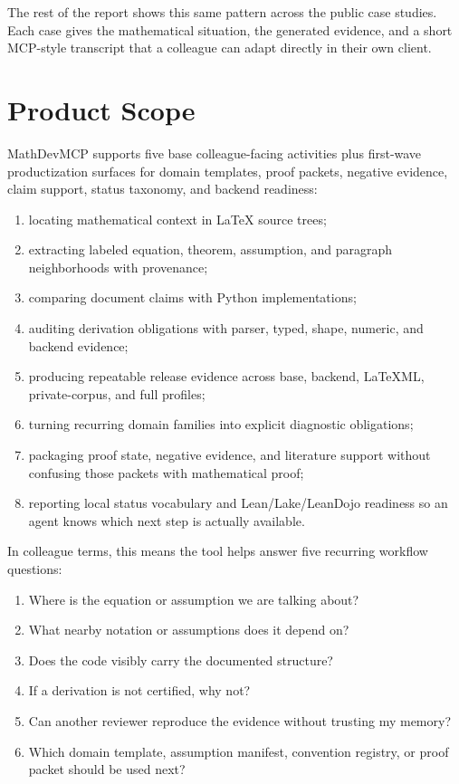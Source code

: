 \documentclass[12pt,a4paper,openany]{book}
\begin{document}
The rest of the report shows this same pattern across the public case studies.
Each case gives the mathematical situation, the generated evidence, and a short
MCP-style transcript that a colleague can adapt directly in their own client.

\chapter{Product Scope}

MathDevMCP supports five base colleague-facing activities plus first-wave
productization surfaces for domain templates, proof packets, negative evidence,
claim support, status taxonomy, and backend readiness:

\begin{enumerate}[label=\arabic*.]
  \item locating mathematical context in LaTeX source trees;
  \item extracting labeled equation, theorem, assumption, and paragraph
        neighborhoods with provenance;
  \item comparing document claims with Python implementations;
  \item auditing derivation obligations with parser, typed, shape, numeric, and
        backend evidence;
  \item producing repeatable release evidence across base, backend, LaTeXML,
        private-corpus, and full profiles;
  \item turning recurring domain families into explicit diagnostic obligations;
  \item packaging proof state, negative evidence, and literature support without
        confusing those packets with mathematical proof;
  \item reporting local status vocabulary and Lean/Lake/LeanDojo readiness so an
        agent knows which next step is actually available.
\end{enumerate}

In colleague terms, this means the tool helps answer five recurring workflow
questions:

\begin{enumerate}[label=\alph*.]
  \item Where is the equation or assumption we are talking about?
  \item What nearby notation or assumptions does it depend on?
  \item Does the code visibly carry the documented structure?
  \item If a derivation is not certified, why not?
  \item Can another reviewer reproduce the evidence without trusting my memory?
  \item Which domain template, assumption manifest, convention registry, or
        proof packet should be used next?
\end{enumerate}
\end{document}
